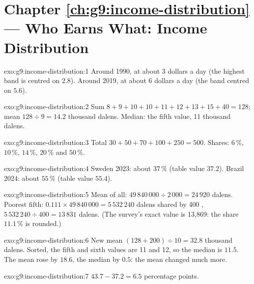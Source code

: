 \section*{Chapter \ref{ch:g9:income-distribution} --- Who Earns What: Income Distribution}

\begin{solution}{exo:g9:income-distribution:1}
Around 1990, at about 3 dollars a day (the highest band is centred on $2.8$). Around 2019, at about 6
dollars a day (the band centred on $5.6$).
\end{solution}

\begin{solution}{exo:g9:income-distribution:2}
Sum $8 + 9 + 10 + 10 + 11 + 12 + 13 + 15 + 40 = 128$; mean $128 \div 9 = 14.2$ thousand dalens. Median: the
fifth value, 11 thousand dalens.
\end{solution}

\begin{solution}{exo:g9:income-distribution:3}
Total $30 + 50 + 70 + 100 + 250 = 500$. Shares: $6\,\%$, $10\,\%$, $14\,\%$, $20\,\%$ and $50\,\%$.
\end{solution}

\begin{solution}{exo:g9:income-distribution:4}
Sweden 2023: about $37\,\%$ (table value $37.2$). Brazil 2024: about $55\,\%$ (table value $55.4$).
\end{solution}

\begin{solution}{exo:g9:income-distribution:5}
Mean of all: $49\,840\,000 \div 2\,000 = 24\,920$ dalens. Poorest fifth: $0.111 \times 49\,840\,000 =
5\,532\,240$ dalens shared by 400 , $5\,532\,240 \div 400 = 13\,831$ dalens. (The survey's exact
value is 13,869: the share $11.1\,\%$ is rounded.)
\end{solution}

\begin{solution}{exo:g9:income-distribution:6}
New mean $(128 + 200) \div 10 = 32.8$ thousand dalens. Sorted, the fifth and sixth values are 11 and 12, so
the median is $11.5$. The mean rose by $18.6$, the median by $0.5$: the mean changed much more.
\end{solution}

\begin{solution}{exo:g9:income-distribution:7}
$43.7 - 37.2 = 6.5$ percentage points.
\end{solution}

